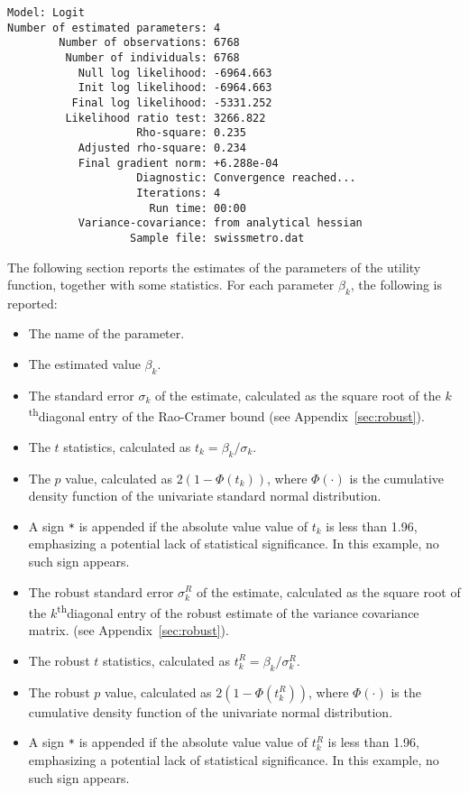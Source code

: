 \documentclass[12pt,a4paper]{article}
\renewcommand{\th}{\textsuperscript{th}}
\begin{document}
\begin{lstlisting}[style=tiny]
                         Model: Logit
Number of estimated parameters: 4
        Number of observations: 6768
         Number of individuals: 6768
           Null log likelihood: -6964.663
           Init log likelihood: -6964.663
          Final log likelihood: -5331.252
         Likelihood ratio test: 3266.822
                    Rho-square: 0.235
           Adjusted rho-square: 0.234
           Final gradient norm: +6.288e-04
                    Diagnostic: Convergence reached...
                    Iterations: 4
                      Run time: 00:00
           Variance-covariance: from analytical hessian
                   Sample file: swissmetro.dat
\end{lstlisting}

The following section reports the estimates of the parameters of the
utility function,
together with some statistics. For each parameter $\beta_k$, the following is reported:
   \begin{itemize}
  \item The name of the parameter.
      \item The estimated value $\beta_k$. 
      \item The standard error $\sigma_k$ of the estimate, calculated as the
         square root of the $k$\th diagonal entry of the
         Rao-Cramer bound (see Appendix~\ref{sec:robust}).
     \item The $t$ statistics, calculated as $t_k=\beta_k/\sigma_k$.
     \item The $p$ value, calculated as $2 (1 - \Phi(t_k))$,
where $\Phi(\cdot)$ is the cumulative density function of the
univariate standard normal distribution. 
     \item  A sign \lstinline$*$ is
         appended if the absolute value value of $t_k$ is less than
         1.96, emphasizing a potential lack of statistical
         significance. In this example, no such sign appears. 
      \item The robust standard error $\sigma^R_k$ of the estimate, calculated as the
         square root of the $k$\th diagonal entry of the
         robust estimate of the variance covariance matrix. (see Appendix~\ref{sec:robust}).
     \item The robust $t$ statistics, calculated as $t^R_k=\beta_k/\sigma^R_k$.
     \item The robust $p$ value, calculated as $2 (1 - \Phi(t^R_k))$,
where $\Phi(\cdot)$ is the cumulative density function of the
univariate normal distribution. 
     \item  A sign \lstinline$*$ is
         appended if the absolute value value of $t^R_k$ is less than
         1.96, emphasizing a potential lack of statistical
         significance. In this example, no such sign appears. 
   \end{itemize}
\end{document}
